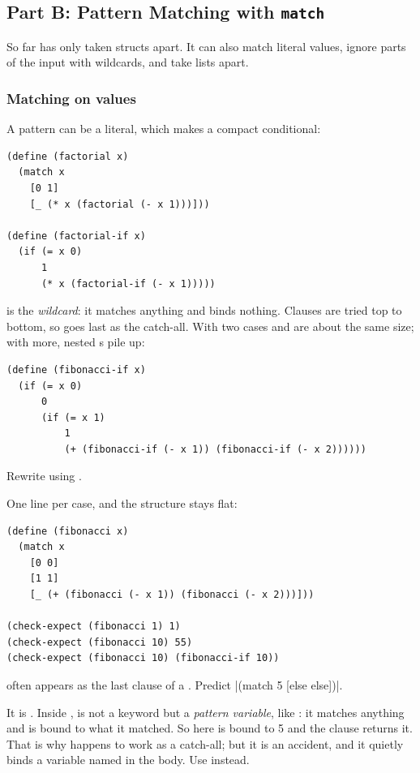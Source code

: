 \subsection{Part B: Pattern Matching with \texttt{match}}

So far  has only taken structs apart. It can also match literal values, ignore parts of the input with wildcards, and take lists apart.

\subsubsection{Matching on values} A pattern can be a literal, which makes  a compact conditional:
\begin{lstlisting}
(define (factorial x)
  (match x
    [0 1]
    [_ (* x (factorial (- x 1)))]))

(define (factorial-if x)
  (if (= x 0)
      1
      (* x (factorial-if (- x 1)))))
\end{lstlisting}
\code{\_} is the \emph{wildcard}: it matches anything and binds nothing. Clauses are tried top to bottom, so \code{\_} goes last as the catch-all. With two cases  and  are about the same size; with more, nested s pile up:
\begin{lstlisting}
(define (fibonacci-if x)
  (if (= x 0)
      0
      (if (= x 1)
          1
          (+ (fibonacci-if (- x 1)) (fibonacci-if (- x 2))))))
\end{lstlisting}

\begin{exercise}
Rewrite  using .
\end{exercise}
\begin{solution}
One line per case, and the structure stays flat:
\begin{lstlisting}
(define (fibonacci x)
  (match x
    [0 0]
    [1 1]
    [_ (+ (fibonacci (- x 1)) (fibonacci (- x 2)))]))

(check-expect (fibonacci 1) 1)
(check-expect (fibonacci 10) 55)
(check-expect (fibonacci 10) (fibonacci-if 10))
\end{lstlisting}
\end{solution}

\begin{exercise}
\code{[else ...]} often appears as the last clause of a . Predict \rkt|(match 5 [else else])|.
\end{exercise}
\begin{solution}
It is . Inside ,  is not a keyword but a \emph{pattern variable}, like : it matches anything and is bound to what it matched. So here  is bound to 5 and the clause returns it. That is why \code{[else ...]} happens to work as a catch-all; but it is an accident, and it quietly binds a variable named  in the body. Use \code{\_} instead.
\end{solution}

